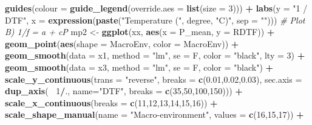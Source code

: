 \documentclass[
]{article}
\newenvironment{Shaded}{\begin{snugshade}}{\end{snugshade}}
\newcommand{\CommentTok}[1]{\textcolor[rgb]{0.56,0.35,0.01}{\textit{#1}}}
\newcommand{\DataTypeTok}[1]{\textcolor[rgb]{0.13,0.29,0.53}{#1}}
\newcommand{\DecValTok}[1]{\textcolor[rgb]{0.00,0.00,0.81}{#1}}
\newcommand{\FloatTok}[1]{\textcolor[rgb]{0.00,0.00,0.81}{#1}}
\newcommand{\KeywordTok}[1]{\textcolor[rgb]{0.13,0.29,0.53}{\textbf{#1}}}
\newcommand{\NormalTok}[1]{#1}
\newcommand{\OperatorTok}[1]{\textcolor[rgb]{0.81,0.36,0.00}{\textbf{#1}}}
\newcommand{\StringTok}[1]{\textcolor[rgb]{0.31,0.60,0.02}{#1}}
\begin{document}
\begin{Shaded}
\begin{Highlighting}[]
{{{{{\StringTok{  }\KeywordTok{guides}\NormalTok{(}\DataTypeTok{colour =} \KeywordTok{guide_legend}\NormalTok{(}\DataTypeTok{override.aes =} \KeywordTok{list}\NormalTok{(}\DataTypeTok{size =} \DecValTok{3}\NormalTok{))) }\OperatorTok{+}
\StringTok{  }\KeywordTok{labs}\NormalTok{(}\DataTypeTok{y =} \StringTok{"1 / DTF"}\NormalTok{, }\DataTypeTok{x =} \KeywordTok{expression}\NormalTok{(}\KeywordTok{paste}\NormalTok{(}\StringTok{"Temperature ("}\NormalTok{, degree, }\StringTok{"C)"}\NormalTok{, }\DataTypeTok{sep =} \StringTok{""}\NormalTok{)))}
\CommentTok{# Plot B) 1/f = a + cP}
\NormalTok{mp2 <-}\StringTok{ }\KeywordTok{ggplot}\NormalTok{(xx, }\KeywordTok{aes}\NormalTok{(}\DataTypeTok{x =}\NormalTok{ P_mean, }\DataTypeTok{y =}\NormalTok{ RDTF)) }\OperatorTok{+}
\StringTok{  }\KeywordTok{geom_point}\NormalTok{(}\KeywordTok{aes}\NormalTok{(}\DataTypeTok{shape =}\NormalTok{ MacroEnv, }\DataTypeTok{color =}\NormalTok{ MacroEnv)) }\OperatorTok{+}
\StringTok{  }\KeywordTok{geom_smooth}\NormalTok{(}\DataTypeTok{data =}\NormalTok{ x1, }\DataTypeTok{method =} \StringTok{"lm"}\NormalTok{, }\DataTypeTok{se =}\NormalTok{ F, }\DataTypeTok{color =} \StringTok{"black"}\NormalTok{, }\DataTypeTok{lty =} \DecValTok{3}\NormalTok{) }\OperatorTok{+}
\StringTok{  }\KeywordTok{geom_smooth}\NormalTok{(}\DataTypeTok{data =}\NormalTok{ x3, }\DataTypeTok{method =} \StringTok{"lm"}\NormalTok{, }\DataTypeTok{se =}\NormalTok{ F, }\DataTypeTok{color =} \StringTok{"black"}\NormalTok{) }\OperatorTok{+}
\StringTok{  }\KeywordTok{scale_y_continuous}\NormalTok{(}\DataTypeTok{trans =} \StringTok{"reverse"}\NormalTok{, }\DataTypeTok{breaks =} \KeywordTok{c}\NormalTok{(}\FloatTok{0.01}\NormalTok{,}\FloatTok{0.02}\NormalTok{,}\FloatTok{0.03}\NormalTok{),}
        \DataTypeTok{sec.axis =} \KeywordTok{dup_axis}\NormalTok{(}\OperatorTok{~}\StringTok{ }\DecValTok{1}\OperatorTok{/}\NormalTok{., }\DataTypeTok{name=}\StringTok{"DTF"}\NormalTok{, }\DataTypeTok{breaks =} \KeywordTok{c}\NormalTok{(}\DecValTok{35}\NormalTok{,}\DecValTok{50}\NormalTok{,}\DecValTok{100}\NormalTok{,}\DecValTok{150}\NormalTok{))) }\OperatorTok{+}
\StringTok{  }\KeywordTok{scale_x_continuous}\NormalTok{(}\DataTypeTok{breaks =} \KeywordTok{c}\NormalTok{(}\DecValTok{11}\NormalTok{,}\DecValTok{12}\NormalTok{,}\DecValTok{13}\NormalTok{,}\DecValTok{14}\NormalTok{,}\DecValTok{15}\NormalTok{,}\DecValTok{16}\NormalTok{)) }\OperatorTok{+}
\StringTok{  }\KeywordTok{scale_shape_manual}\NormalTok{(}\DataTypeTok{name =} \StringTok{"Macro-environment"}\NormalTok{, }\DataTypeTok{values =} \KeywordTok{c}\NormalTok{(}\DecValTok{16}\NormalTok{,}\DecValTok{15}\NormalTok{,}\DecValTok{17}\NormalTok{)) }\OperatorTok{+}
}}}}}
\end{Highlighting}
\end{Shaded}
\end{document}
